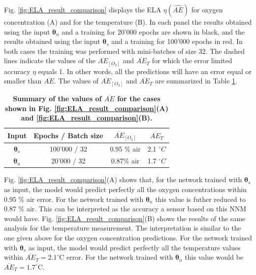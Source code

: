 \documentclass[9pt,twocolumn,twoside,pdftex]{optica}
\begin{document}
Fig. \ref{fig:ELA_result_comparison} displays the ELA $\eta(\widehat {AE})$ for oxygen concentration (A) and for the temperature (B). In each panel the results obtained using the input ${\pmb \theta}_n$ and a training for 20'000 epochs are shown in black, and the results obtained using the input ${\pmb \theta}_s$ and a training for 100'000 epochs in red. In both cases the training was performed with mini-batches of size 32.
The dashed lines indicate the values of the $\overline{AE}_{[O_2]}$ and $\overline{AE}_{T}$ for which the error limited accuracy $\eta$ equals 1. In other words, all the predictions will have an error equal or smaller than $\overline{AE}$.
The values of $\overline{AE}_{[O_2]}$ and $\overline{AE}_{T}$ are summarized in Table \ref{table:ela}.

\begin{table}[t!]
\centering
\caption {\bf Summary of the values of $\overline{AE}$ for the cases shown in Fig. \ref{fig:ELA_result_comparison}(A) and \ref{fig:ELA_result_comparison}(B).}

\begin{tabular}{ cccc}
\smallskip 
 Input & Epochs / Batch size & $\overline{AE}_{[O_2]}$ & $\overline{AE}_{T}$  \\ 
 \hline
${\pmb \theta}_s$ & 100'000 / 32 & 0.95 \% air & 2.1 $^\circ C$\\ 
${\pmb \theta}_n $ & 20'000 / 32 & 0.87\% air & 1.7 $^\circ C$\\ 

\end{tabular}
\label{table:ela}
\end{table}

Fig. \ref{fig:ELA_result_comparison}(A) shows that, for the network trained with ${\pmb \theta}_s$ as input, the model would predict perfectly all the oxygen concentrations within 0.95 \% air error. For the network trained with ${\pmb \theta}_n$ this value is futher reduced to 0.87 \% air. This can be interpreted as the accuracy a sensor based on this NNM  would have.
Fig. \ref{fig:ELA_result_comparison}(B) shows the results of the same analysis for the temperature measurement. The interpretation is similar to the one given above for the oxygen concentration predictions. For the network trained with ${\pmb \theta}_s$ as input, the model would predict perfectly all the temperature values within $\overline{AE}_{T}=2.1^\circ$C error. For the network trained with ${\pmb \theta}_n$ this value would be  $\overline{AE}_{T}=1.7^\circ$C. 
\end{document}
